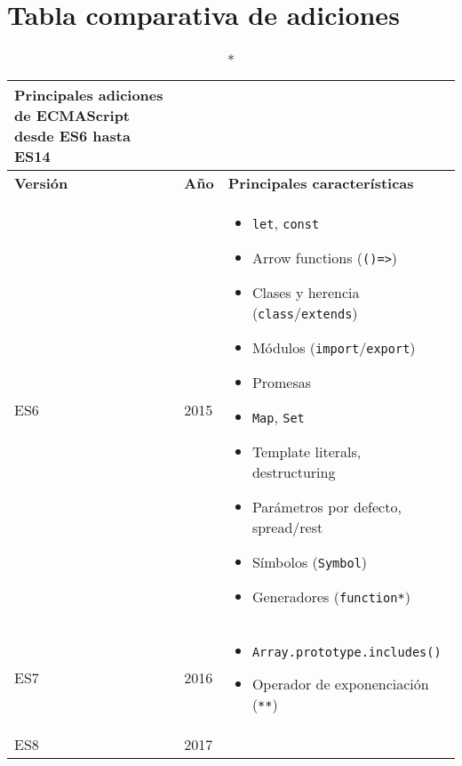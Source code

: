 \documentclass[12pt]{article}
\begin{document}
\section*{Tabla comparativa de adiciones}
\small
\begin{longtable}{@{}lll@{}}
    \caption*{Principales adiciones de ECMAScript desde ES6 hasta ES14} \\
    \toprule
    \textbf{Versión} & \textbf{Año} & \textbf{Principales características} \\
    \midrule
    \endhead
    \midrule
    ES6  & 2015 & \begin{minipage}[t]{0.7\linewidth}
               \begin{itemize}
                 \item \texttt{let}, \texttt{const}
                 \item Arrow functions (\texttt{()=>})
                 \item Clases y herencia (\texttt{class}/\texttt{extends})
                 \item Módulos (\texttt{import}/\texttt{export})
                 \item Promesas
                 \item \texttt{Map}, \texttt{Set}
                 \item Template literals, destructuring
                 \item Parámetros por defecto, spread/rest
                 \item Símbolos (\texttt{Symbol})
                 \item Generadores (\texttt{function*})
               \end{itemize}
             \end{minipage} \\
    \addlinespace
    ES7  & 2016 & \begin{minipage}[t]{0.7\linewidth}
               \begin{itemize}
                 \item \texttt{Array.prototype.includes()}
                 \item Operador de exponenciación (\texttt{**})
               \end{itemize}
             \end{minipage} \\
    \addlinespace
    ES8  & 2017 & \begin{minipage}[t]{0.7\linewidth}
               \begin{itemize}

\end{itemize}
\end{minipage}
\end{longtable}
\end{document}

